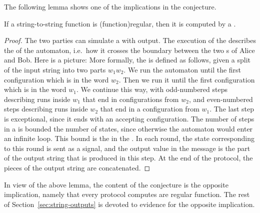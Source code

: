     The following lemma shows one of the implications in the conjecture.

\begin{lemma}\label{lem:from-regular-to-protocol}
    If a string-to-string function is \kl(function){regular}, then it is computed by a .
\end{lemma}
\begin{proof}
    The two parties can simulate a  with output. The execution
    of the  describes the  of the automaton, i.e.~how
    it crosses the boundary between the two s of Alice and Bob.
    Here is a picture:  More formally, the  is
    defined as follows, given  a split of the input string into two parts $w_1
    w_2$. We run the automaton until the first configuration which is in the
    word $w_2$. Then we run it until the first configuration which is in the
    word $w_1$. We continue this way, with odd-numbered steps describing runs
    inside $w_1$ that end in  configurations from $w_2$, and even-numbered
    steps describing runs inside $w_2$ that end in a configuration from $w_1$.
    The last step is exceptional, since it ends with an accepting
    configuration. The number of steps in a  is bounded  the
    number of states, since otherwise the automaton would enter an infinite
    loop. This bound is the  in the . In each round,
    the state corresponding to this round is sent as a signal, and the output
    value in the message is the  part of the output string that is produced in
    this  step. At the end of the protocol, the pieces of the output string are
    concatenated. 
\end{proof}

In view of the above lemma, the content of the conjecture is the opposite
implication, namely that every protocol computes are regular function.  The
rest of Section~\ref{sec:string-outputs} is devoted to  evidence for the
opposite implication.


